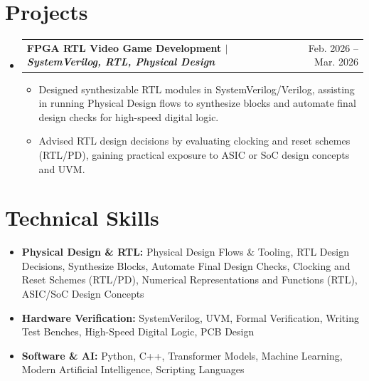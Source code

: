\documentclass[letterpaper,12pt]{article}
\makeatletter
\newcommand{\resumeItem}[1]{\item{#1}}
\newcommand{\resumeProjectHeading}[2]{
  \item
    \begin{tabular*}{0.97\textwidth}[t]{l@{\extracolsep{\fill}}r}
      \textbf{#1} & #2 \\
    \end{tabular*}
}
\newcommand{\resumeSubHeadingListStart}{\begin{itemize}[label=\textbullet]}
\newcommand{\resumeSubHeadingListEnd}{\end{itemize}}
\newcommand{\resumeItemListStart}{\begin{itemize}[label=-]}
\newcommand{\resumeItemListEnd}{\end{itemize}}
\makeatother
\begin{document}
\section{Projects}
\resumeSubHeadingListStart
  \resumeProjectHeading{FPGA RTL Video Game Development $\vert$ \emph{SystemVerilog, RTL, Physical Design}}{Feb. 2026 -- Mar. 2026}
  \resumeItemListStart
    \resumeItem{Designed synthesizable RTL modules in SystemVerilog/Verilog, assisting in running Physical Design flows to synthesize blocks and automate final design checks for high-speed digital logic.}
    \resumeItem{Advised RTL design decisions by evaluating clocking and reset schemes (RTL/PD), gaining practical exposure to ASIC or SoC design concepts and UVM.}
  \resumeItemListEnd
\resumeSubHeadingListEnd

\section{Technical Skills}
\resumeSubHeadingListStart
  \item{\textbf{Physical Design \& RTL:} Physical Design Flows \& Tooling, RTL Design Decisions, Synthesize Blocks, Automate Final Design Checks, Clocking and Reset Schemes (RTL/PD), Numerical Representations and Functions (RTL), ASIC/SoC Design Concepts}
  \item{\textbf{Hardware Verification:} SystemVerilog, UVM, Formal Verification, Writing Test Benches, High-Speed Digital Logic, PCB Design}
  \item{\textbf{Software \& AI:} Python, C++, Transformer Models, Machine Learning, Modern Artificial Intelligence, Scripting Languages}
\resumeSubHeadingListEnd
\end{document}
